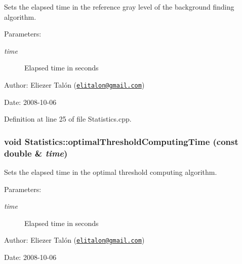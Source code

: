 Sets the elapsed time in the reference gray level of the background finding algorithm. 

\begin{Desc}
\item[Parameters:]
\begin{description}
\item[{\em time}]Elapsed time in seconds\end{description}
\end{Desc}
\begin{Desc}
\item[Author:]Eliezer Talón (\href{mailto:elitalon@gmail.com}{\tt elitalon@gmail.com}) \end{Desc}
\begin{Desc}
\item[Date:]2008-10-06 \end{Desc}


Definition at line 25 of file Statistics.cpp.\hypertarget{class_statistics_eed35a930f29f4596f3715306e1e1dbc}{
\subsubsection[optimalThresholdComputingTime]{\setlength{\rightskip}{0pt plus 5cm}void Statistics::optimalThresholdComputingTime (const double \& {\em time})}}
\label{class_statistics_eed35a930f29f4596f3715306e1e1dbc}


Sets the elapsed time in the optimal threshold computing algorithm. 

\begin{Desc}
\item[Parameters:]
\begin{description}
\item[{\em time}]Elapsed time in seconds\end{description}
\end{Desc}
\begin{Desc}
\item[Author:]Eliezer Talón (\href{mailto:elitalon@gmail.com}{\tt elitalon@gmail.com}) \end{Desc}
\begin{Desc}
\item[Date:]2008-10-06 \end{Desc}


